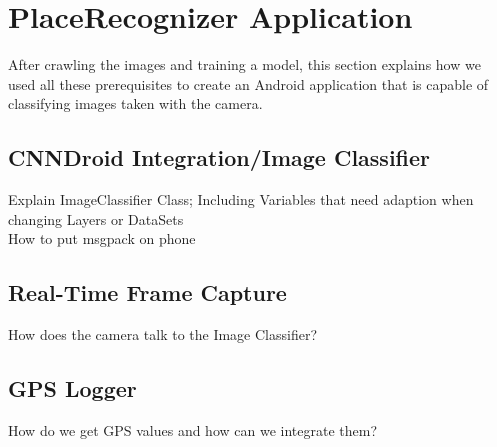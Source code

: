 \section {PlaceRecognizer Application}
After crawling the images and training a model, this section explains how we used all these prerequisites to create an Android application that is capable of classifying images taken with the camera.

\subsection {CNNDroid Integration/Image Classifier}
Explain ImageClassifier Class; Including Variables that need adaption when changing Layers or DataSets\\
How to put msgpack on phone

\subsection {Real-Time Frame Capture}
How does the camera talk to the Image Classifier?

\subsection {GPS Logger}
How do we get GPS values and how can we integrate them?

